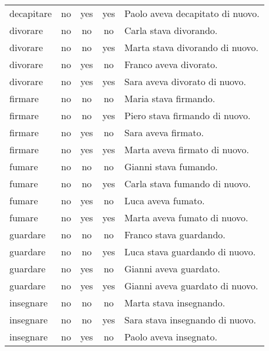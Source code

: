 \begin{longtable}{l|ccc|p{5cm}}
decapitare     & no   & yes        & yes       & Paolo aveva decapitato di nuovo.      \\
divorare       & no   & no         & no        & Carla stava divorando.                \\
divorare       & no   & no         & yes       & Marta stava divorando di nuovo.       \\
divorare       & no   & yes        & no        & Franco aveva divorato.                \\
divorare       & no   & yes        & yes       & Sara aveva divorato di nuovo.         \\
firmare        & no   & no         & no        & Maria stava firmando.                 \\
firmare        & no   & no         & yes       & Piero stava firmando di nuovo.        \\
firmare        & no   & yes        & no        & Sara aveva firmato.                   \\
firmare        & no   & yes        & yes       & Marta aveva firmato di nuovo.         \\
fumare         & no   & no         & no        & Gianni stava fumando.                 \\
fumare         & no   & no         & yes       & Carla stava fumando di nuovo.         \\
fumare         & no   & yes        & no        & Luca aveva fumato.                    \\
fumare         & no   & yes        & yes       & Marta aveva fumato di nuovo.          \\
guardare       & no   & no         & no        & Franco stava guardando.               \\
guardare       & no   & no         & yes       & Luca stava guardando di nuovo.        \\
guardare       & no   & yes        & no        & Gianni aveva guardato.                \\
guardare       & no   & yes        & yes       & Gianni aveva guardato di nuovo.       \\
insegnare      & no   & no         & no        & Marta stava insegnando.               \\
insegnare      & no   & no         & yes       & Sara stava insegnando di nuovo.       \\
insegnare      & no   & yes        & no        & Paolo aveva insegnato.                \\

\end{longtable}
